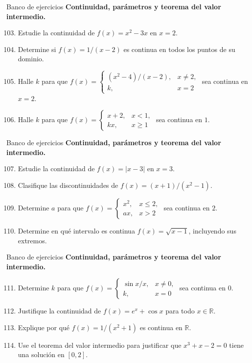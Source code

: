 \documentclass[12pt,aspectratio=169]{beamer}
\newcommand{\R}{\mathbb{R}}
\begin{document}
\begin{frame}[t,allowframebreaks]{Banco de ejercicios}
\small
\noindent \textbf{Continuidad, parámetros y teorema del valor intermedio.}\par\smallskip
\begin{enumerate}\setcounter{enumi}{102}
\item Estudie la continuidad de $f(x)=x^2-3x$ en $x=2$.
\item Determine si $f(x)=1/(x-2)$ es continua en todos los puntos de su dominio.
\item Halle $k$ para que $f(x)=\begin{cases}(x^2-4)/(x-2),&x\ne2,\\k,&x=2\end{cases}$ sea continua en $x=2$.
\item Halle $k$ para que $f(x)=\begin{cases}x+2,&x<1,\\kx,&x\ge1\end{cases}$ sea continua en $1$.
\end{enumerate}
\end{frame}


\begin{frame}[t,allowframebreaks]{Banco de ejercicios}
\small
\noindent \textbf{Continuidad, parámetros y teorema del valor intermedio.}\par\smallskip
\begin{enumerate}\setcounter{enumi}{106}
\item Estudie la continuidad de $f(x)=|x-3|$ en $x=3$.
\item Clasifique las discontinuidades de $f(x)=(x+1)/(x^2-1)$.
\item Determine $a$ para que $f(x)=\begin{cases}x^2,&x\le2,\\ax,&x>2\end{cases}$ sea continua en $2$.
\item Determine en qué intervalo es continua $f(x)=\sqrt{x-1}$, incluyendo sus extremos.
\end{enumerate}
\end{frame}


\begin{frame}[t,allowframebreaks]{Banco de ejercicios}
\small
\noindent \textbf{Continuidad, parámetros y teorema del valor intermedio.}\par\smallskip
\begin{enumerate}\setcounter{enumi}{110}
\item Determine $k$ para que $f(x)=\begin{cases}\sin x/x,&x\ne0,\\k,&x=0\end{cases}$ sea continua en $0$.
\item Justifique la continuidad de $f(x)=e^x+\cos x$ para todo $x\in\R$.
\item Explique por qué $f(x)=1/(x^2+1)$ es continua en $\R$.
\item Use el teorema del valor intermedio para justificar que $x^3+x-2=0$ tiene una solución en $[0,2]$.
\end{enumerate}
\end{frame}
\end{document}
